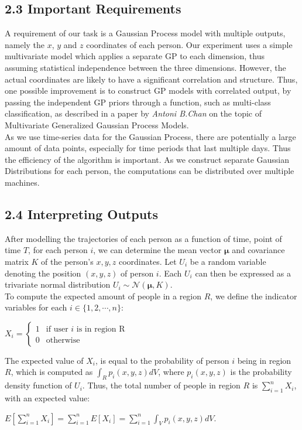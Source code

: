 \documentclass[letterpaper]{article}
\begin{document}
\subsection{2.3  Important Requirements}

A requirement of our task is a Gaussian Process model with multiple outputs, namely the $x$, $y$ and $z$ coordinates of each person. Our experiment uses a simple multivariate model which applies a separate GP to each dimension, thus assuming statistical independence between the three dimensions. However, the actual coordinates are likely to have a significant correlation and structure. Thus, one possible improvement is to construct GP models with correlated output, by passing the independent GP priors through a function, such as multi-class classification, as described in a paper by {\it Antoni B.Chan} on the topic of Multivariate Generalized Gaussian Process Models. \\

As we use time-series data for the Gaussian Process, there are potentially a large amount of data points, especially for time periods that last multiple days. Thus the efficiency of the algorithm is important. As we construct separate Gaussian Distributions for each person, the computations can be distributed over multiple machines.

\subsection{2.4  Interpreting Outputs}

After modelling the trajectories of each person as a function of time, point of time $T$, for each person $i$, we can determine the mean vector $\boldsymbol{\mu}$ and covariance matrix $K$ of the person's $x,y,z$ coordinates. Let $U_i$ be a random variable denoting the position $(x,y,z)$ of person $i$. Each $U_i$ can then be expressed as a trivariate normal distribution $U_i \sim \mathcal{N}(\boldsymbol{\mu},K)$.\\

To compute the expected amount of people in a region $R$, we define the indicator variables for each $i \in \{1,2,\cdots,n\}$:
\begin{center}
$X_i =
\begin{cases}
    1 &\text{if user }i\text{ is in region R}\\
    0 &\text{otherwise}
\end{cases}$
\end{center}
The expected value of $X_i$, is equal to the probability of person $i$ being in region $R$, which is computed as $\int_R p_i(x,y,z)dV$, where $p_i(x,y,z)$ is the probability density function of $U_i$. Thus, the total number of people in region $R$ is $\sum_{i=1}^n X_i$, with an expected value:
\begin{center}
$\displaystyle E[\sum_{i=1}^n X_i] = \sum_{i=1}^n E[X_i] = \sum_{i=1}^n \int_V p_i(x,y,z)dV$.
\end{center}
\end{document}
